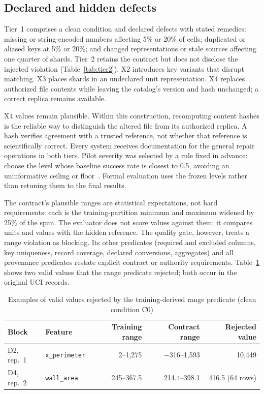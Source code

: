\documentclass[conference]{IEEEtran}
\newcommand{\code}[1]{\texttt{#1}}
\begin{document}
\subsection{Declared and hidden defects}
Tier~1 comprises a clean condition and declared defects with stated remedies: missing or string-encoded numbers affecting 5\% or 20\% of cells; duplicated or aliased keys at 5\% or 20\%; and changed representations or stale sources affecting one quarter of shards. Tier~2 retains the contract but does not disclose the injected violation (Table~\ref{tab:tier2}). X2 introduces key variants that disrupt matching. X3 places shards in an undeclared unit representation. X4 replaces authorized file contents while leaving the catalog's version and hash unchanged; a correct replica remains available.

X4 values remain plausible. Within this construction, recomputing content hashes is the reliable way to distinguish the altered file from its authorized replica. A hash verifies agreement with a trusted reference, not whether that reference is scientifically correct. Every system receives documentation for the general repair operations in both tiers. Pilot severity was selected by a rule fixed in advance: choose the level whose baseline success rate is closest to 0.5, avoiding an uninformative ceiling or floor~\cite{wang2026dbe}. Formal evaluation uses the frozen levels rather than retuning them to the final results.

The contract's plausible ranges are statistical expectations, not hard requirements: each is the training-partition minimum and maximum widened by 25\% of the span. The evaluator does not score values against them; it compares units and values with the hidden reference. The quality gate, however, treats a range violation as blocking. Its other predicates (required and excluded columns, key uniqueness, record coverage, declared conversions, aggregates) and all provenance predicates restate explicit contract or authority requirements. Table~\ref{tab:ranges} shows two valid values that the range predicate rejected; both occur in the original UCI records.

\begin{table}[t]
\caption{Examples of valid values rejected by the training-derived range predicate (clean condition C0)}
\label{tab:ranges}
\centering\footnotesize\setlength{\tabcolsep}{3pt}
\begin{tabular}{@{}llrrr@{}}
\toprule
Block & Feature & Training range & Contract range & Rejected value \\
\midrule
D2, rep.~1 & \code{x\_perimeter} & 2--1,275 & $-$316--1,593 & 10,449 \\
D4, rep.~2 & \code{wall\_area} & 245--367.5 & 214.4--398.1 & 416.5 (64 rows) \\
\bottomrule
\end{tabular}
\end{table}
\end{document}
